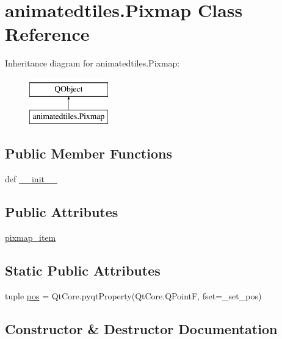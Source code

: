 \hypertarget{classanimatedtiles_1_1Pixmap}{}\section{animatedtiles.\+Pixmap Class Reference}
\label{classanimatedtiles_1_1Pixmap}
Inheritance diagram for animatedtiles.\+Pixmap\+:\begin{figure}[H]
\begin{center}
\leavevmode
\includegraphics[height=2.000000cm]{classanimatedtiles_1_1Pixmap}
\end{center}
\end{figure}
\subsection*{Public Member Functions}
\begin{DoxyCompactItemize}
\item 
def \hyperlink{classanimatedtiles_1_1Pixmap_ab5d10f0df633631d42b2900ea5ffcf33}{\+\_\+\+\_\+init\+\_\+\+\_\+}
\end{DoxyCompactItemize}
\subsection*{Public Attributes}
\begin{DoxyCompactItemize}
\item 
\hyperlink{classanimatedtiles_1_1Pixmap_a8fe0f8d2519441eee3917042487a0d2c}{pixmap\+\_\+item}
\end{DoxyCompactItemize}
\subsection*{Static Public Attributes}
\begin{DoxyCompactItemize}
\item 
tuple \hyperlink{classanimatedtiles_1_1Pixmap_a0ccd0668f7c429960d656cddd51a6d1e}{pos} = Qt\+Core.\+pyqt\+Property(Qt\+Core.\+Q\+Point\+F, fset=\+\_\+set\+\_\+pos)
\end{DoxyCompactItemize}


\subsection{Constructor \& Destructor Documentation}
\hypertarget{classanimatedtiles_1_1Pixmap_ab5d10f0df633631d42b2900ea5ffcf33}{}

